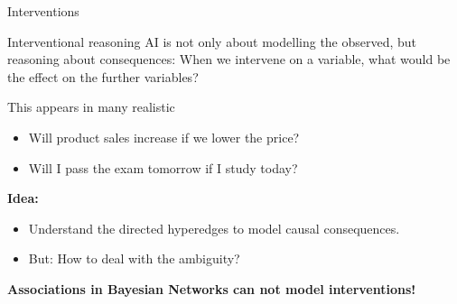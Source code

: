 \documentclass{beamer}
\begin{document}
    \begin{frame}{Interventions}

        \begin{block}{Interventional reasoning}
            AI is not only about modelling the observed, but reasoning about consequences:
            When we intervene on a variable, what would be the effect on the further variables?
        \end{block}

        This appears in many realistic
        \begin{itemize}
            \item Will product sales increase if we lower the price?
            \item Will I pass the exam tomorrow if I study today?
        \end{itemize}

            {\bf Idea:}
        \begin{itemize}
            \item Understand the directed hyperedges to model causal consequences.
            \item But: How to deal with the ambiguity?
        \end{itemize}

        \begin{center}
            \bf Associations in Bayesian Networks can not model interventions!
        \end{center}
    \end{frame}
\end{document}

